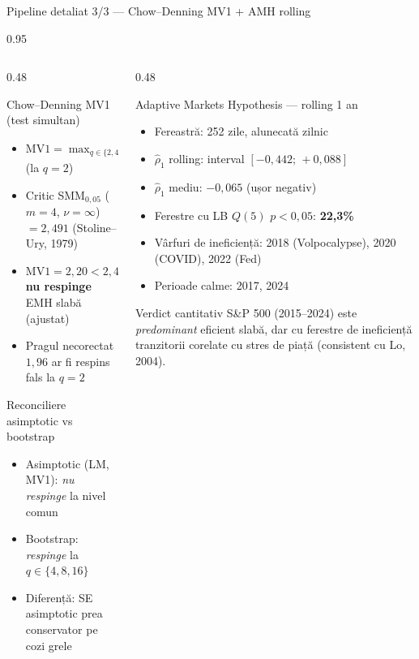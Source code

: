 \documentclass[9pt, aspectratio=169, t]{beamer}
\begin{document}
\begin{frame}[shrink=12]{Pipeline detaliat 3/3 --- Chow--Denning MV1 + AMH rolling}
\begin{cminipage}{0.95\textwidth}
\begin{columns}[T]
\begin{column}{0.48\textwidth}
\begin{block}{Chow--Denning MV1 (test simultan)}
\footnotesize
\begin{itemize}\setlength{\itemsep}{0pt}
    \item $\mathrm{MV1} = \max_{q \in \{2,4,8,16\}} |Z^*(q)| = 2{,}199$ (la $q=2$)
    \item Critic SMM$_{0{,}05}$ ($m=4$, $\nu=\infty$) $= 2{,}491$ (Stoline--Ury, 1979)
    \item $\mathrm{MV1} = 2{,}20 < 2{,}491 \Rightarrow$ \textbf{nu respinge} EMH slabă (ajustat)
    \item Pragul necorectat $1{,}96$ ar fi respins fals la $q=2$
\end{itemize}
\end{block}
\begin{block}{Reconciliere asimptotic vs bootstrap}
\footnotesize
\begin{itemize}\setlength{\itemsep}{0pt}
    \item Asimptotic (LM, MV1): \emph{nu respinge} la nivel comun
    \item Bootstrap: \emph{respinge} la $q \in \{4, 8, 16\}$
    \item Diferență: SE asimptotic prea conservator pe cozi grele
\end{itemize}
\end{block}
\end{column}
\begin{column}{0.48\textwidth}
\begin{block}{Adaptive Markets Hypothesis --- rolling 1 an}
\footnotesize
\begin{itemize}\setlength{\itemsep}{0pt}
    \item Fereastră: 252 zile, alunecată zilnic
    \item $\hat\rho_1$ rolling: interval $[-0{,}442;\, +0{,}088]$
    \item $\hat\rho_1$ mediu: $-0{,}065$ (ușor negativ)
    \item Ferestre cu LB $Q(5)$ $p<0{,}05$: \textbf{22{,}3\%}
    \item Vârfuri de ineficiență: 2018 (Volpocalypse), 2020 (COVID), 2022 (Fed)
    \item Perioade calme: 2017, 2024
\end{itemize}
\end{block}
\begin{alertblock}{Verdict cantitativ}
\footnotesize
S\&P 500 (2015--2024) este \emph{predominant} eficient slabă, dar cu ferestre de ineficiență tranzitorii corelate cu stres de piață (consistent cu Lo, 2004).
\end{alertblock}
\end{column}
\end{columns}
\end{cminipage}
\end{frame}
\end{document}
